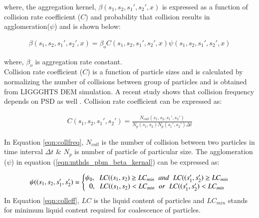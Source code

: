\documentclass[preprint,11pt,authoryear]{elsarticle}
\begin{document}
where, the aggregation kernel, $\beta(s_1,s_2, s_1',s_2',x)$ is expressed as a function of collision 
rate coefficient ($C$) and probability that collision results in agglomeration($\psi$) \citep{ingram2005}
and is shown below: 

\begin{align}
\beta(s_1,s_2,s_1',s_2',x) = \beta_oC(s_1,s_2,s_1',s_2',x)\psi(s_1,s_2,s_1',s_2',x)
\label{eqn:mthds_pbm_beta_kernal}
\end{align}

where, $\beta_o$ is aggregation rate constant.\\
Collision rate coefficient ($C$) is a function of particle sizes and is calculated by normalizing the 
number of collisions between group of particles \citep{gantt2006} and is obtained from LIGGGHTS 
DEM simulation. A recent study shows that collision frequency depends on PSD as well 
\citep{sen2014}. Collision rate coefficient can be expressed as:

\begin{align}
C(s_1,s_2,s_1',s_2')=\frac{N_{coll}(s_1,s_2,s_1',s_2')}{N_p(s_1,s_2)N_p(s_1',s_2')\Delta t}
\label{eqn:collfreq}
\end{align}

In Equation \ref{eqn:collfreq}, $N_{coll}$ is the number of collision between two particles in 
time interval $\Delta t$ \& $N_p$ is number of particle of particular size. The agglomeration 
($\psi$) in equation (\ref{eqn:mthds_pbm_beta_kernal}) can be expressed as:

\begin{align}
\psi((s_1,s_2,s_1',s_2') = 
\left\{\begin{matrix}
\psi_0,\hspace{0.2cm} LC((s_1,s_2) \geq LC_{min}\hspace{0.2cm} and\hspace{0.2cm} LC((s_1',s_2') \geq LC_{min}	\\ 
0,\hspace{0.2cm} LC((s_1,s_2) < LC_{min}\hspace{0.2cm} or\hspace{0.2cm} LC((s_1',s_2') < LC_{min}
\end{matrix}\right.
\label{eqn:colleff}
\end{align}
 In Equation \ref{eqn:colleff}, $LC$ is the liquid content of particles and $LC_{min}$ stands for minimum 
 liquid content required for coalescence of particles. 
\end{document}
